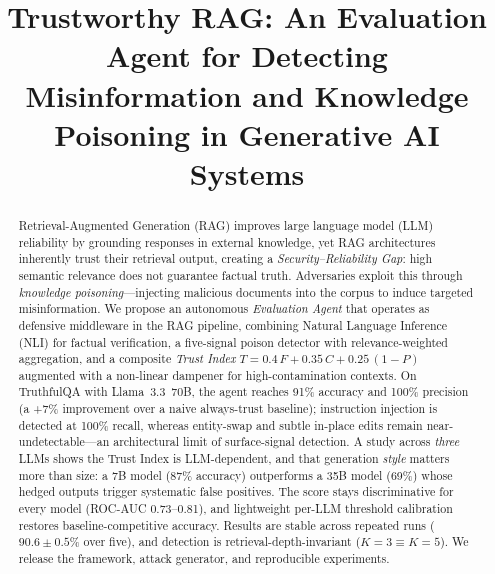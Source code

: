 \documentclass[conference]{IEEEtran}
\begin{document}
\title{Trustworthy RAG: An Evaluation Agent for Detecting Misinformation and
Knowledge Poisoning in Generative AI Systems}

\author{
\and
{}
}

\maketitle

\begin{abstract}
Retrieval-Augmented Generation (RAG) improves large language model (LLM)
reliability by grounding responses in external knowledge, yet RAG architectures
inherently trust their retrieval output, creating a \emph{Security--Reliability
Gap}: high semantic relevance does not guarantee factual truth. Adversaries
exploit this through \emph{knowledge poisoning}---injecting malicious documents
into the corpus to induce targeted misinformation. We propose an autonomous
\emph{Evaluation Agent} that operates as defensive middleware in the RAG
pipeline, combining Natural Language Inference (NLI) for factual verification, a
five-signal poison detector with relevance-weighted aggregation, and a composite
\emph{Trust Index} $T = 0.4\,F + 0.35\,C + 0.25\,(1-P)$ augmented with a
non-linear dampener for high-contamination contexts. On TruthfulQA with
Llama~3.3~70B, the agent reaches 91\% accuracy and 100\% precision (a +7\%
improvement over a naive always-trust baseline); instruction injection is
detected at 100\% recall, whereas entity-swap and subtle in-place edits remain
near-undetectable---an architectural limit of surface-signal detection. A
study across \emph{three} LLMs shows the Trust Index is LLM-dependent, and that
generation \emph{style} matters more than size: a 7B model (87\% accuracy)
outperforms a 35B model (69\%) whose hedged outputs trigger systematic false
positives. The score stays discriminative for every model (ROC-AUC 0.73--0.81),
and lightweight per-LLM threshold calibration restores baseline-competitive
accuracy. Results are stable across repeated runs ($90.6{\pm}0.5\%$ over five),
and detection is retrieval-depth-invariant ($K{=}3 \equiv K{=}5$). We release the framework, attack generator, and
reproducible experiments.
\end{abstract}
\end{document}
